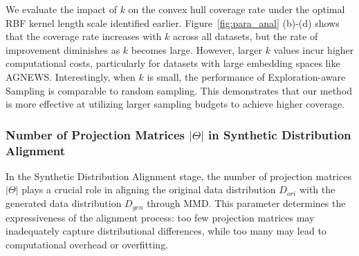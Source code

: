 
We evaluate the impact of $k$ on the convex hull coverage rate under the optimal RBF kernel length scale identified earlier. Figure~\ref{fig:para_anal} (b)-(d) shows that the coverage rate increases with $k$ across all datasets, but the rate of improvement diminishes as $k$ becomes large.
However, larger $k$ values incur higher computational costs, particularly for datasets with large embedding spaces like AGNEWS.
Interestingly, when $k$ is small, the performance of Exploration-aware Sampling is comparable to random sampling. 
This demonstrates that our method is more effective at utilizing larger sampling budgets to achieve higher coverage.


\subsubsection{Number of Projection Matrices $|\Theta|$ in Synthetic Distribution Alignment}

In the Synthetic Distribution Alignment stage, the number of projection matrices $|\Theta|$ plays a crucial role in aligning the original data distribution $D_{ori}$ with the generated data distribution $D_{gen}$ through MMD. This parameter determines the expressiveness of the alignment process: too few projection matrices may inadequately capture distributional differences, while too many may lead to computational overhead or overfitting.

